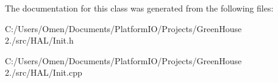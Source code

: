 The documentation for this class was generated from the following files\+:\begin{DoxyCompactItemize}
\item 
C\+:/\+Users/\+Omen/\+Documents/\+Platform\+I\+O/\+Projects/\+Green\+House 2./src/\+H\+A\+L/Init.\+h\item 
C\+:/\+Users/\+Omen/\+Documents/\+Platform\+I\+O/\+Projects/\+Green\+House 2./src/\+H\+A\+L/Init.\+cpp\end{DoxyCompactItemize}
